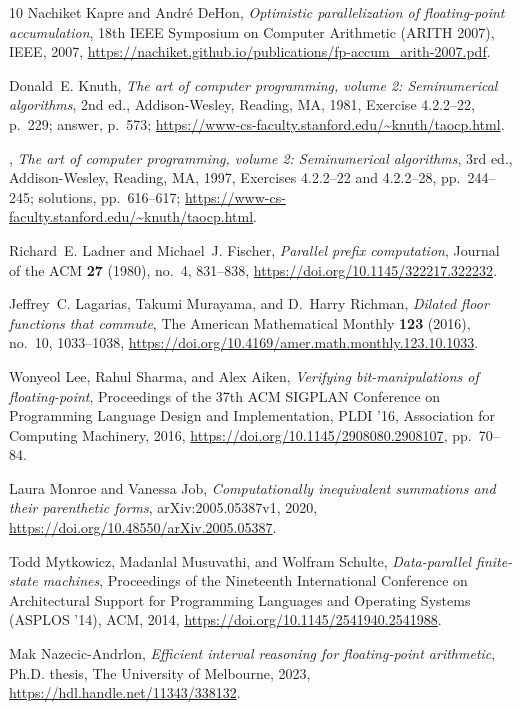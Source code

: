 \documentclass[11pt,reqno]{amsart}
\theoremstyle{definition}
\theoremstyle{remark}
\numberwithin{equation}{section}
\begin{document}
\begin{thebibliography}{10}
Nachiket Kapre and Andr{\'e} DeHon, \emph{Optimistic parallelization of
  floating-point accumulation}, 18th {IEEE} Symposium on Computer Arithmetic
  ({ARITH} 2007), IEEE, 2007,
  \url{https://nachiket.github.io/publications/fp-accum_arith-2007.pdf}.

Donald~E. Knuth, \emph{The art of computer programming, volume 2: Seminumerical
  algorithms}, 2nd ed., Addison-Wesley, Reading, MA, 1981, Exercise 4.2.2--22,
  p.~229; answer, p.~573;
  \url{https://www-cs-faculty.stanford.edu/~knuth/taocp.html}.

\bysame, \emph{The art of computer programming, volume 2: Seminumerical
  algorithms}, 3rd ed., Addison-Wesley, Reading, MA, 1997, Exercises 4.2.2--22
  and 4.2.2--28, pp.~244--245; solutions, pp.~616--617;
  \url{https://www-cs-faculty.stanford.edu/~knuth/taocp.html}.

Richard~E. Ladner and Michael~J. Fischer, \emph{Parallel prefix computation},
  Journal of the ACM \textbf{27} (1980), no.~4, 831--838,
  \url{https://doi.org/10.1145/322217.322232}.

Jeffrey~C. Lagarias, Takumi Murayama, and D.~Harry Richman, \emph{Dilated floor
  functions that commute}, The American Mathematical Monthly \textbf{123}
  (2016), no.~10, 1033--1038,
  \url{https://doi.org/10.4169/amer.math.monthly.123.10.1033}.

Wonyeol Lee, Rahul Sharma, and Alex Aiken, \emph{Verifying bit-manipulations of
  floating-point}, Proceedings of the 37th ACM SIGPLAN Conference on
  Programming Language Design and Implementation, PLDI '16, Association for
  Computing Machinery, 2016, \url{https://doi.org/10.1145/2908080.2908107},
  pp.~70--84.

Laura Monroe and Vanessa Job, \emph{Computationally inequivalent summations and
  their parenthetic forms}, arXiv:2005.05387v1, 2020,
  \url{https://doi.org/10.48550/arXiv.2005.05387}.

Todd Mytkowicz, Madanlal Musuvathi, and Wolfram Schulte, \emph{Data-parallel
  finite-state machines}, Proceedings of the Nineteenth International
  Conference on Architectural Support for Programming Languages and Operating
  Systems ({ASPLOS} '14), ACM, 2014,
  \url{https://doi.org/10.1145/2541940.2541988}.

Mak Nazecic-Andrlon, \emph{Efficient interval reasoning for floating-point
  arithmetic}, Ph.D. thesis, The University of Melbourne, 2023,
  \url{https://hdl.handle.net/11343/338132}.


\end{thebibliography}
\end{document}
